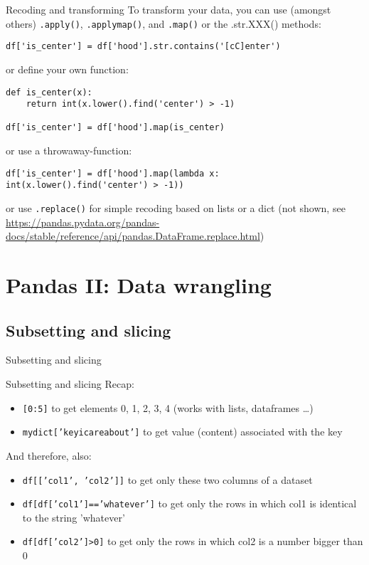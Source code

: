 \documentclass[compress]{beamer}
\begin{document}
\begin{frame}[fragile]{Recoding and transforming}
	\small
To transform your data, you can use (amongst others) \texttt{.apply()}, \texttt{.applymap()}, and \texttt{.map()} or the .str.XXX() methods:

\begin{lstlisting}
df['is_center'] = df['hood'].str.contains('[cC]enter')
\end{lstlisting}
or define your own function:
\begin{lstlisting}
def is_center(x):
    return int(x.lower().find('center') > -1)
    
df['is_center'] = df['hood'].map(is_center)
\end{lstlisting}
or use a throwaway-function:
\begin{lstlisting}
df['is_center'] = df['hood'].map(lambda x: int(x.lower().find('center') > -1))
\end{lstlisting}

or use \texttt{.replace()} for simple recoding based on lists or a dict (not shown, see \url{https://pandas.pydata.org/pandas-docs/stable/reference/api/pandas.DataFrame.replace.html})



\end{frame}



\section{Pandas II: Data wrangling}
\subsection{Subsetting and slicing}

\begin{frame}[plain]
Subsetting and slicing
\end{frame}

\begin{frame}{Subsetting and slicing}
Recap:
\begin{itemize}[<+->]
	\item \texttt{[0:5]} to get elements 0, 1, 2, 3, 4 (works with lists, dataframes \ldots)
	\item \texttt{mydict['keyicareabout']} to get value (content) associated with the key
\end{itemize}

\pause

And therefore, also:

\begin{itemize}[<+->]
	\item \texttt{df[['col1', 'col2']]} to get only these two columns of a dataset
	\item \texttt{df[df['col1']=='whatever']} to get only the rows in which col1 is identical to the string 'whatever'
	\item \texttt{df[df['col2']>0]} to get only the rows in which col2 is a number bigger than 0
\end{itemize}


\end{frame}
\end{document}
